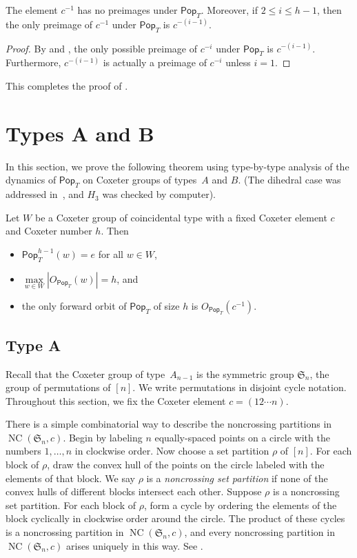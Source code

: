\documentclass[ALCO,ThmDefs,Unicode,epreuves]{cedram}
\newcommand{\darkblue}{\color{darkblue}}
\newcommand{\defn}[1]{\emph{\darkblue #1}}
\newcommand{\pop}{\mathsf{Pop}}
\DeclareMathOperator{\NC}{NC}
\begin{document}
\begin{coro}
The element $c^{-1}$ has no preimages under $\pop_T$.  Moreover, if $2 \leq i \leq h-1$, then the only preimage of $c^{-1}$ under $\pop_T$ is $c^{-(i-1)}$.
\end{coro}

\begin{proof}
  By  and , the only possible preimage of $c^{-i}$ under $\pop_T$ is $c^{-(i-1)}$.  Furthermore, $c^{-(i-1)}$ is actually a preimage of $c^{-i}$ unless $i=1$.
\end{proof}

This completes the proof of .




\section{Types A and B}
\label{sec:typeab}
In this section, we prove the following theorem using type-by-type analysis of the dynamics of $\pop_T$ on Coxeter groups of types~$A$ and $B$.  (The dihedral case was addressed in~, and $H_3$ was checked by computer).
\begin{theorem}
Let $W$ be a Coxeter group of coincidental type with a fixed Coxeter element $c$ and Coxeter number $h$. Then 
\begin{itemize}
    \item $\pop_T^{h-1}(w)=e$ for all $w\in W$,
    \item  $\max\limits _{w\in W}\left|O_{\pop_T}(w)\right|=h$, and
    \item the only forward orbit of $\pop_T$ of size $h$ is $O_{\pop_T}(c^{-1})$. 
\end{itemize}
\end{theorem}


\subsection{Type A}
\label{sec:typea}
Recall that the Coxeter group of type~$A_{n-1}$ is the symmetric group $\mathfrak S_n$, the group of permutations of $[n]$. We write permutations in disjoint cycle notation. Throughout this section, we fix the Coxeter element $c=(12\cdots n)$. 

There is a simple combinatorial way to describe the noncrossing partitions in $\NC(\mathfrak S_n,c)$. Begin by labeling $n$ equally-spaced points on a circle with the numbers $1,\ldots,n$ in clockwise order. Now choose a set partition $\rho$ of $[n]$. For each block of $\rho$, draw the convex hull of the points on the circle labeled with the elements of that block. We say $\rho$ is a \defn{noncrossing set partition} if none of the convex hulls of different blocks intersect each other. Suppose $\rho$ is a noncrossing set partition. For each block of $\rho$, form a cycle by ordering the elements of the block cyclically in clockwise order around the circle. The product of these cycles is a noncrossing partition in $\NC(\mathfrak S_n,c)$, and every noncrossing partition in $\NC(\mathfrak S_n,c)$ arises uniquely in this way. See .
\end{document}
